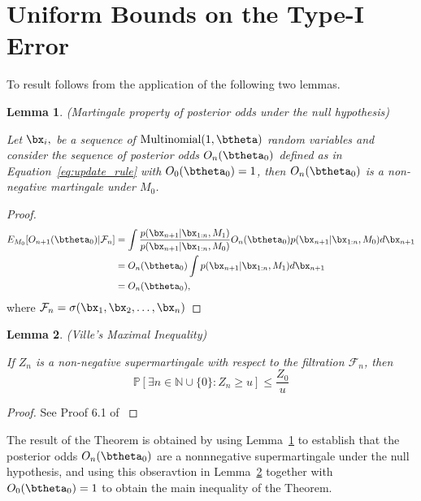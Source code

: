 \documentclass[11pt]{article}
\newtheorem{lemma}{Lemma}[section]
\begin{document}
\section{Uniform Bounds on the Type-I Error}
\label{app:type_1_error}
To result follows from the application of the following two lemmas.
\begin{lemma}(Martingale property of posterior odds under the null hypothesis)
  
  \noindent Let $\bx_i,$ be a sequence of $\text{Multinomial}(1,\btheta)$ random variables and consider the sequence of posterior odds $O_n(\btheta_0)$ defined as in Equation~\ref{eq:update_rule} with $O_0(\btheta_0)=1$, then $O_n(\btheta_0)$ is a non-negative martingale under $M_0$.
  \label{lem:posterior_odds_martingale}
    \end{lemma}
  \begin{proof}
  \begin{align*}
    E_{M_0}[O_{n+1}(\btheta_0)|\mathcal{F}_n]  &= \int \frac{p(\bx_{n+1}|\bx_{1:n},M_1)}{p(\bx_{n+1}|\bx_{1:n},M_0)} O_{n}(\btheta_0) p(\bx_{n+1}|\bx_{1:n},M_0) d\bx_{n+1}\\
    &=  O_{n}(\btheta_0) \int p(\bx_{n+1}|\bx_{1:n},M_1) d\bx_{n+1}\\
    &=  O_{n}(\btheta_0),
  \end{align*}
  where $\mathcal{F}_{n} = \sigma(\bx_1,\bx_2,\dots, \bx_n)$
\end{proof}

\begin{lemma}(Ville's Maximal Inequality)
  
\label{lem:durrett}
  \noindent If $Z_{n}$ is a non-negative supermartingale with respect to the filtration $\mathcal{F}_n$, then
  \begin{equation}
    \label{eq:durrett}
    \mathbb{P}[\exists n \in \mathbb{N}\cup \lbrace 0 \rbrace : Z_n \geq u] \leq \frac{Z_0}{u}
  \end{equation}
\end{lemma}
\begin{proof}
  See Proof 6.1 of \cite{howard}
\end{proof}
The result of the Theorem is obtained by using Lemma~\ref{lem:posterior_odds_martingale} to establish that the posterior odds $O_n(\btheta_0)$ are a nonnnegative supermartingale under the null hypothesis, and using this obseravtion in Lemma~\ref{lem:durrett} together with  $O_0(\btheta_0) = 1$  to obtain the main inequality of the Theorem.
\end{document}
